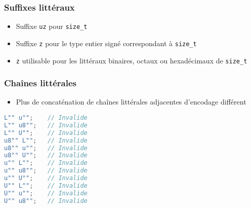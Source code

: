 \documentclass[C++.tex]{subfiles}
\begin{document}
\begin{frame}[fragile]
	\frametitle{Suffixes littéraux}
	\begin{itemize}
		\item Suffixe \lstinline|uz| pour \lstinline|size_t|
		\item Suffixe \lstinline|z| pour le type entier signé correspondant à \lstinline|size_t|


		\item \lstinline|z| utilisable pour les littéraux binaires, octaux ou hexadécimaux de \lstinline|size_t|
	\end{itemize}
\end{frame}

\begin{frame}[fragile]
	\frametitle{Chaînes littérales}
	\begin{itemize}
		\item Plus de concaténation de chaînes littérales adjacentes d'encodage différent
	\end{itemize}

	\begin{lstlisting}[language=C++]
L"" u"";	// Invalide
L"" u8"";	// Invalide
L"" U"";	// Invalide
u8"" L"";	// Invalide
u8"" u"";	// Invalide
u8"" U"";	// Invalide
u"" L"";	// Invalide
u"" u8"";	// Invalide
u"" U"";	// Invalide
U"" L"";	// Invalide
U"" u"";	// Invalide
U"" u8"";	// Invalide\end{lstlisting}


\end{frame}
\end{document}

